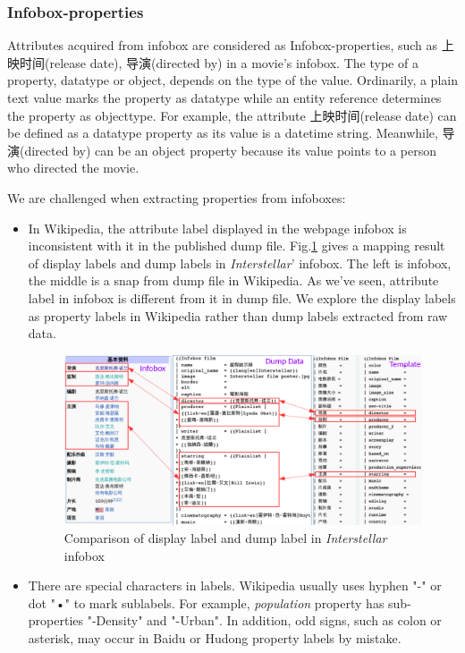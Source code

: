 \documentclass[runningheads,a4paper]{llncs}
\begin{document}
\subsubsection{Infobox-properties}
Attributes acquired from infobox are considered as Infobox-properties, such as 上映时间(release date), 导演(directed by) in a movie's infobox. The type of a property, datatype or object, depends on the type of the value. Ordinarily, a plain text value marks the property as datatype while an entity reference determines the property as objecttype. For example, the attribute 上映时间(release date) can be defined as a datatype property as its value is a datetime string. Meanwhile, 导演(directed by) can be an object property because its value points to a person who directed the movie.

We are challenged when extracting properties from infoboxes:
\begin{itemize}
    \item In Wikipedia, the attribute label displayed in the webpage infobox is inconsistent with it in the published dump file. Fig.\ref{fig:infobox-template} gives a mapping result of display labels and dump labels in \emph{Interstellar}' infobox. The left is infobox, the middle is a snap from dump file in Wikipedia. As we've seen, attribute label in infobox is different from it in dump file. We explore the display labels as property labels in Wikipedia rather than dump labels extracted from raw data. 
    \begin{figure}[ht]
        \centerline{\includegraphics[width=1\columnwidth]{fig/infobox-template}}
        \caption{Comparison of display label and dump label in \emph{Interstellar} infobox}
        \label{fig:infobox-template}
    \end{figure}%
\item There are special characters in labels. Wikipedia usually uses hyphen "-" or dot "•" to mark sublabels. For example, \emph{population} property has sub-properties "-Density" and "-Urban". In addition, odd signs, such as colon or asterisk, may occur in Baidu or Hudong property labels by mistake.
\end{itemize}
\end{document}
